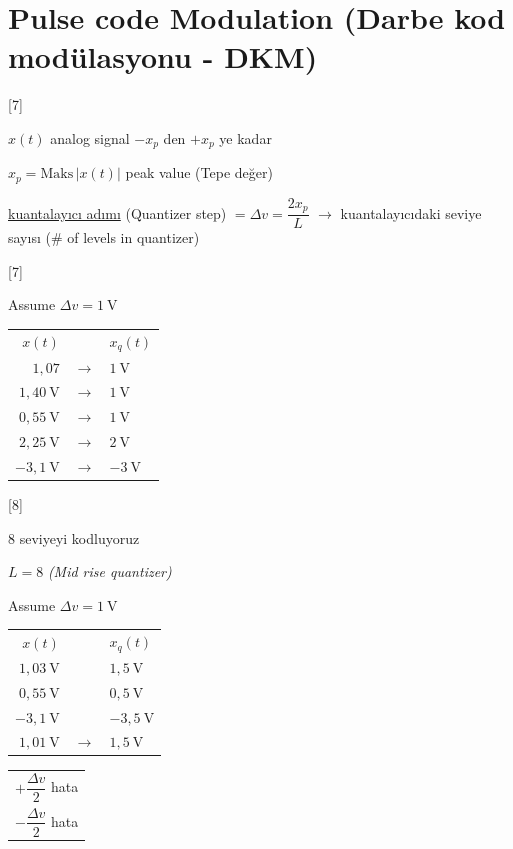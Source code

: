 \documentclass[11pt,a4paper]{article}
\begin{document}
\section{Pulse code Modulation (Darbe kod modülasyonu - DKM)}

[7]

$x(t)$ analog signal \hfill $-x_p$ den $+x_p$ ye kadar

$x_p=\mathrm{Maks}\,|x(t)|$ \quad peak value (Tepe değer)

\underline{kuantalayıcı adımı} (Quantizer step) $=\Delta v=\dfrac{2x_p}{L}$ $\longrightarrow$ kuantalayıcıdaki seviye sayısı (\# of levels in quantizer)

[7]

Assume $\Delta v=1\ \mathrm{V}$

\begin{center}
\begin{tabular}{rcl}
$x(t)$ & & $x_q(t)$\\[3pt]
$1{,}07$ & $\longrightarrow$ & $1\ \mathrm{V}$\\
$1{,}40\ \mathrm{V}$ & $\longrightarrow$ & $1\ \mathrm{V}$\\
$0{,}55\ \mathrm{V}$ & $\longrightarrow$ & $1\ \mathrm{V}$\\
$2{,}25\ \mathrm{V}$ & $\longrightarrow$ & $2\ \mathrm{V}$\\
$-3{,}1\ \mathrm{V}$ & $\longrightarrow$ & $-3\ \mathrm{V}$
\end{tabular}
\end{center}

[8]

8 seviyeyi kodluyoruz

$L=8$ \quad \textit{(Mid rise quantizer)}

Assume $\Delta v=1\ \mathrm{V}$

\begin{center}
\begin{tabular}{rcl}
\underline{$x(t)$} & & \underline{$x_q(t)$}\\[3pt]
$1{,}03\ \mathrm{V}$ & & $1{,}5\ \mathrm{V}$\\
$0{,}55\ \mathrm{V}$ & & $0{,}5\ \mathrm{V}$\\
$-3{,}1\ \mathrm{V}$ & & $-3{,}5\ \mathrm{V}$\\[6pt]
$1{,}01\ \mathrm{V}$ & $\longrightarrow$ & $1{,}5\ \mathrm{V}$
\end{tabular}
\qquad
\begin{tabular}{l}
$+\dfrac{\Delta v}{2}$ hata\\[4pt]
$-\dfrac{\Delta v}{2}$ hata
\end{tabular}
\end{center}
\end{document}
